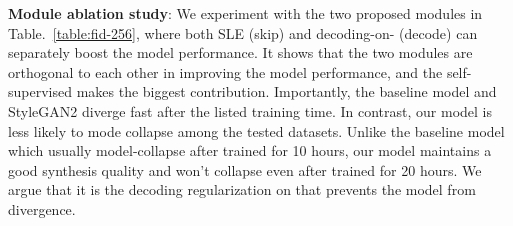 \documentclass{article} \usepackage{iclr2021_conference,times}
\begin{document}
\textbf{Module ablation study}: We experiment with the two proposed modules in Table.~\ref{table:fid-256}, where both SLE (skip) and decoding-on- (decode) can separately boost the model performance. It shows that the two modules are orthogonal to each other in improving the model performance, and the self-supervised  makes the biggest contribution. Importantly, the baseline model and StyleGAN2 diverge fast after the listed training time. In contrast, our model is less likely to mode collapse among the tested datasets. Unlike the baseline model which usually model-collapse after trained for 10 hours, our model maintains a good synthesis quality and won't collapse even after trained for 20 hours. We argue that it is the decoding regularization on  that prevents the model from divergence.

\begin{table}[h]
\vspace{-0mm}
\caption{FID comparison at  resolution on few-sample datasets.}
\vspace{-2mm}
\label{table:fid-1024}
\begin{center}
\end{center}
\vspace{-0mm}

\end{table}
\end{document}
